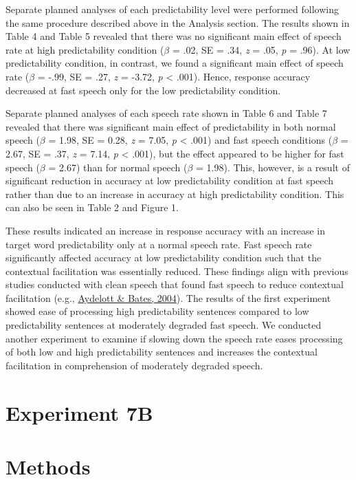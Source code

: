 \documentclass[a4paper, nobind]{templates/ociamthesis}
\begin{document}
Separate planned analyses of each predictability level were performed following the same procedure described above in the Analysis section.
The results shown in Table 4 and Table 5 revealed that there was no significant main effect of speech rate at high predictability condition (\(\beta\) = .02, SE = .34, \emph{z} = .05, \emph{p} = .96).
At low predictability condition, in contrast, we found a significant main effect of speech rate (\(\beta\) = -.99, SE = .27, \emph{z} = -3.72, \emph{p} \textless{} .001).
Hence, response accuracy decreased at fast speech only for the low predictability condition.

Separate planned analyses of each speech rate shown in Table 6 and Table 7 revealed that there was significant main effect of predictability in both normal speech (\(\beta\) = 1.98, SE = 0.28, \emph{z} = 7.05, \emph{p} \textless{} .001) and fast speech conditions (\(\beta\) = 2.67, SE = .37, \emph{z} = 7.14, \emph{p} \textless{} .001),
but the effect appeared to be higher for fast speech (\(\beta\) = 2.67) than for normal speech (\(\beta\) = 1.98).
This, however, is a result of significant reduction in accuracy at low predictability condition at fast speech rather than due to an increase in accuracy at high predictability condition. This can also be seen in Table 2 and Figure 1.

These results indicated an increase in response accuracy with an increase in target word predictability only at a normal speech rate.
Fast speech rate significantly affected accuracy at low predictability condition such that the contextual facilitation was essentially reduced.
These findings align with previous studies conducted with clean speech that found fast speech to reduce contextual facilitation (e.g., \protect\hyperlink{ref-Aydelott2004}{Aydelott \& Bates, 2004}).
The results of the first experiment showed ease of processing high predictability sentences compared to low predictability sentences at moderately degraded fast speech.
We conducted another experiment to examine if slowing down the speech rate eases processing of both low and high predictability sentences and increases the contextual facilitation in comprehension of moderately degraded speech.

\hypertarget{experiment-7b}{%
\section{Experiment 7B}\label{experiment-7b}}

\hypertarget{methods-4}{%
\section{Methods}\label{methods-4}}
\end{document}
